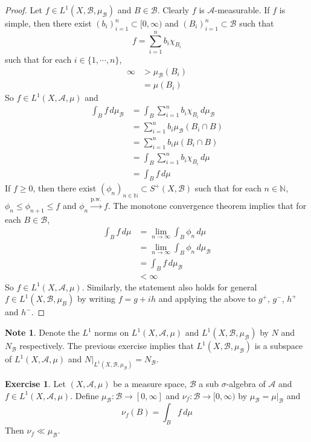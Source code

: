 \documentclass[12pt]{amsart}
\theoremstyle{definition}
\newtheorem{note}[definition]{Note}
\newtheorem{ex}[definition]{Exercise}
\newcommand{\sig}{\sigma}
\newcommand{\N}{\mathbb{N}}
\newcommand{\MA}{\mathcal{A}}
\newcommand{\MB}{\mathcal{B}}
\newcommand{\dmu}{\, d \mu}
\newcommand{\Rg}{[0,\infty)}
\newcommand{\limn}{\lim \limits_{n \rightarrow \infty}}
\newcommand{\convt}[1]{\xrightarrow{\text{#1}}}
\begin{document}
	\begin{proof}
		Let $f \in L^1(X, \MB, \mu_{\MB})$ and $B \in \MB$. Clearly $f$ is $\MA$-measurable. If $f$ is simple, then there exist $(b_i)_{i=1}^n \subset \Rg$ and $(B_i)_{i=1}^n \subset \MB$ such that $$f = \sum_{i=1}^n b_i \chi_{B_i}$$ such that for each $i \in \{1, \cdots, n\}$, 
		\begin{align*}
			\infty 
			&> \mu_{\MB}(B_i) \\
			&= \mu(B_i)
		\end{align*}
		So $f \in L^1(X, \MA, \mu)$ and 
		\begin{align*}
			\int_B f \dmu_{\MB} 
			&= \int_B \sum_{i=1}^n b_i \chi_{B_i} \dmu_{\MB} \\
			&= \sum_{i=1}^n b_i \mu_{\MB}(B_i \cap B)\\
			&= \sum_{i=1}^n b_i \mu(B_i \cap B)\\
			&= \int_B \sum_{i=1}^n b_i\chi_{B_i} \dmu \\
			&= \int_B f \dmu
		\end{align*}
		If $f \geq 0$, then there exist $(\phi_n)_{n \in \N} \subset S^+(X, \MB)$ such that for each $n \in \N$, $\phi_n \leq \phi_{n+1} \leq f$ and $\phi_n \convt{p.w.} f$. The monotone convergence theorem implies that for each $B \in \MB$,
		\begin{align*}
			\int_B f \dmu
			&= \limn \int_B \phi_n \dmu \\
			&= \limn \int_B \phi_n \dmu_{\MB} \\
			& = \int_B f \dmu_{\MB} \\
			& < \infty
		\end{align*}
		So $f \in L^1(X, \MA, \mu)$.
		Similarly, the statement also holds for general $f \in L^1(X, \MB, \mu_B)$ by writing $f = g+ih$ and applying the above to $g^+$, $g^-$, $h^+$ and $h^-$.
	\end{proof}
	
	\begin{note}
		Denote the $L^1$ norms on $L^1(X, \MA, \mu)$ and $L^1(X, \MB, \mu_{\MB})$ by $N$ and $N_{\MB}$ respectively. The previous exercise implies that $L^1(X, \MB, \mu_{\MB})$ is a subspace of $L^1(X, \MA, \mu)$ and $N|_{L^1(X, \MB, \mu_{\MB})} = N_{\MB}$.
	\end{note}
	
	\begin{ex}
		Let $(X, \MA, \mu)$ be a measure space, $\MB$ a sub $\sig$-algebra of $\MA$ and $f \in L^1(X, \MA, \mu)$. Define $\mu_{\MB}: \MB \rightarrow [0, \infty] $ and $\nu_f: \MB \rightarrow [0,\infty)$ by $\mu_{\MB} = \mu|_{\MB}$ and 
		$$\nu_f(B) = \int_B f \dmu $$ Then $\nu_f \ll \mu_{\MB}$. 
	\end{ex}	
	
\end{document}
